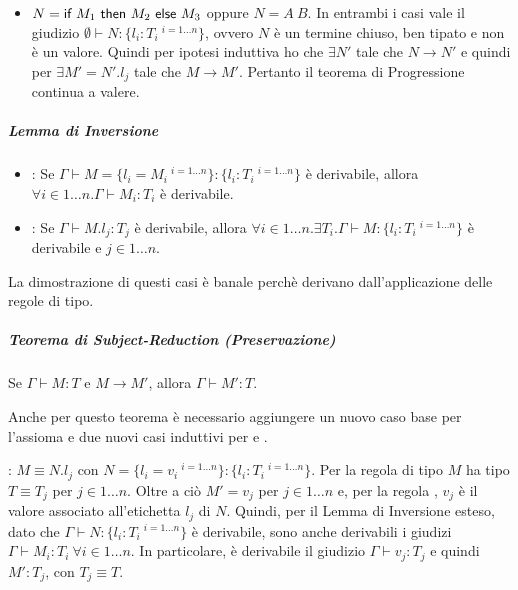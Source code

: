 \begin{itemize}
\begin{itemize}
		\item $N = \IF{M_1}{M_2}{M_3}$ oppure $N = A \: B$. In entrambi i casi vale il giudizio $\emptyset \vdash N : \{ l_i : T_i \:^{i = 1 \ldots n}\}$, ovvero $N$ \`e un termine chiuso, ben tipato e non \`e un valore. 
		Quindi per ipotesi induttiva ho che $\exists N'$ tale che $N \to N'$ e quindi per  $\exists M' = N'.l_j$ tale che $M \to M'$.
		Pertanto il teorema di Progressione continua a valere.
	\end{itemize}
\end{itemize}


\subparagraph{Lemma di Inversione}

\begin{itemize}
	\item {}: Se $\Gamma \vdash M = \{ l_i = M_i \:^{i = 1 \ldots n} \} : \{ l_i : T_i \:^{i = 1 \ldots n} \}$ \`e derivabile, allora $\forall i \in 1 \ldots n. \Gamma \vdash M_i : T_i$ \`e derivabile.
	\item {}: Se $\Gamma \vdash M.l_j : T_j$ \`e derivabile, allora $\forall i \in 1\ldots n.\exists T_i. \Gamma \vdash M :  \{ l_i : T_i \:^{i = 1 \ldots n} \}$ \`e derivabile e $j \in 1 \ldots n$.
\end{itemize}

\noindent La dimostrazione di questi casi \`e banale perch\`e derivano dall'applicazione delle regole di tipo.


\subparagraph{Teorema di Subject-Reduction (Preservazione)}

\begin{centering}
	Se $\Gamma \vdash M : T$ e $M \to M'$, allora $\Gamma \vdash M':T$.
\end{centering}

\noindent Anche per questo teorema \`e necessario aggiungere un nuovo caso base per l'assioma  e due nuovi casi induttivi per  e .

\vspace{10px}

: $M \equiv N.l_j$ con $N = \{ l_i = v_i \:^{i = 1 \ldots n} \} : \{ l_i : T_i \:^{i = 1 \ldots n} \}$.
Per la regola di tipo  $M$ ha tipo $T \equiv T_j$ per $j \in 1\ldots n$.
Oltre a ci\`o $M' = v_j$ per $j \in 1\ldots n$ e, per la regola , $v_j$ \`e il valore associato all'etichetta $l_j$ di $N$. Quindi, per il Lemma di Inversione esteso, dato che $\Gamma \vdash N : \{ l_i : T_i \:^{i = 1 \ldots n} \}$ \`e derivabile, sono anche derivabili i giudizi $\Gamma \vdash M_i :T_i \: \forall i \in 1 \ldots n$.
In particolare, \`e derivabile il giudizio $\Gamma \vdash v_j : T_j$ e quindi $M' : T_j$, con $T_j \equiv T$.

